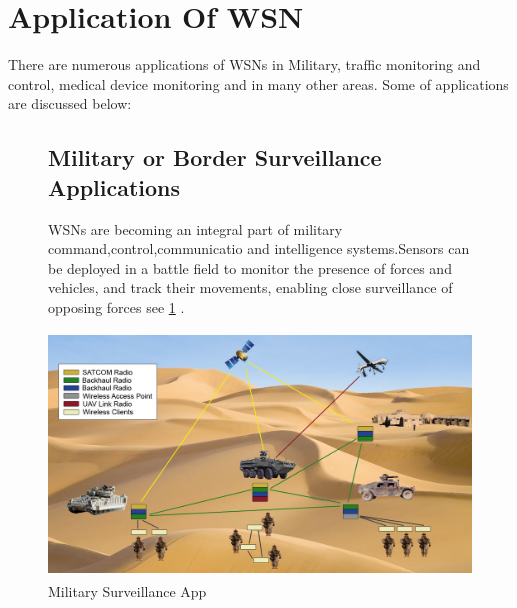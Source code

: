 \section{Application Of WSN}
	There are numerous applications of WSNs in Military, traffic monitoring and control, medical device monitoring and in many other areas. Some of applications are discussed below:
	\begin{figure}
	\subsection{Military or Border Surveillance Applications}
		WSNs are becoming an integral part of military command,control,communicatio and intelligence systems.Sensors can be deployed in a battle field to
		monitor the presence of forces and vehicles, and track their movements, enabling close surveillance of opposing forces  see \ref{fig:x army} .\cite{application}
	

	
	\hfill
	\includegraphics[scale=0.5,width=12cm,height=6.5cm]{photos/army.jpg}
	\caption{Military Surveillance App}
	\label{fig:x army}
		\centering
	\hspace*{\fill}
	\end{figure}

